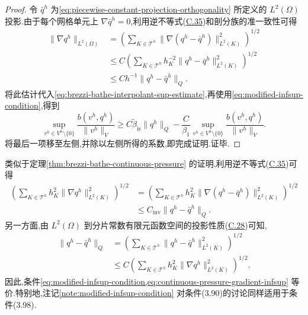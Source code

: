 \begin{proof}
令 $\bar q^h$ 为\cref{eq:piecewise-constant-projection-orthogonality} 所定义的 $L^2(\Omega)$ 投影.由于每个网格单元上 $\nabla\bar q^h=0$,利用逆不等式(\hyperref[eq:appendix-c-35]{C.35})和剖分族的准一致性可得
\[
\begin{aligned}
  \|\nabla q^h\|_{L^2(\Omega)}
  &=\left(\sum_{K\in\mathcal{T}^h}
       \|\nabla(q^h-\bar q^h)\|_{L^2(K)}^2\right)^{1/2}\\
  &\le C\left(\sum_{K\in\mathcal{T}^h}
       h_K^{-2}\|q^h-\bar q^h\|_{L^2(K)}^2\right)^{1/2}\\
  &\le Ch^{-1}\|q^h-\bar q^h\|_Q.
\end{aligned}
\]
将此估计代入\cref{eq:brezzi-bathe-interpolant-sup-estimate},再使用\cref{eq:modified-infsup-condition},得到
\[
  \sup_{v^h\in V^h\setminus\{0\}}
    \frac{b(v^h,q^h)}{\|v^h\|_V}
  \ge C\widetilde\beta_{\mathrm{is}}\|q^h\|_Q
       -\frac{C}{\beta_1}
        \sup_{v^h\in V^h\setminus\{0\}}
          \frac{b(v^h,q^h)}{\|v^h\|_V}.
\]
将最后一项移至左侧,并除以左侧所得的系数,即完成证明.证毕.
\end{proof}

\begin{note}[假设(3.90)和(3.98)的等价性]\label{note:modified-gradient-infsup-equivalence}
类似于定理\ref{thm:brezzi-bathe-continuous-pressure} 的证明,利用逆不等式(\hyperref[eq:appendix-c-35]{C.35})可得
\[
\begin{aligned}
  \left(\sum_{K\in\mathcal{T}^h}
       h_K^2\|\nabla q^h\|_{L^2(K)}^2\right)^{1/2}
  &=\left(\sum_{K\in\mathcal{T}^h}
       h_K^2\|\nabla(q^h-\bar q^h)\|_{L^2(K)}^2\right)^{1/2}\\
  &\le C_{\mathrm{inv}}\|q^h-\bar q^h\|_Q.
\end{aligned}
\]
另一方面,由 $L^2(\Omega)$ 到分片常数有限元函数空间的投影性质(\hyperref[eq:appendix-c-28]{C.28})可知,
\[
\begin{aligned}
  \|q^h-\bar q^h\|_Q
  &=\left(\sum_{K\in\mathcal{T}^h}
       \|q^h-\bar q^h\|_{L^2(K)}^2\right)^{1/2}\\
  &\le C\left(\sum_{K\in\mathcal{T}^h}
       h_K^2\|\nabla q^h\|_{L^2(K)}^2\right)^{1/2}.
\end{aligned}
\]
因此,条件\cref{eq:modified-infsup-condition,eq:continuous-pressure-gradient-infsup} 等价.特别地,注记\ref{note:modified-infsup-condition} 对条件(3.90)的讨论同样适用于条件(3.98).
\end{note}

